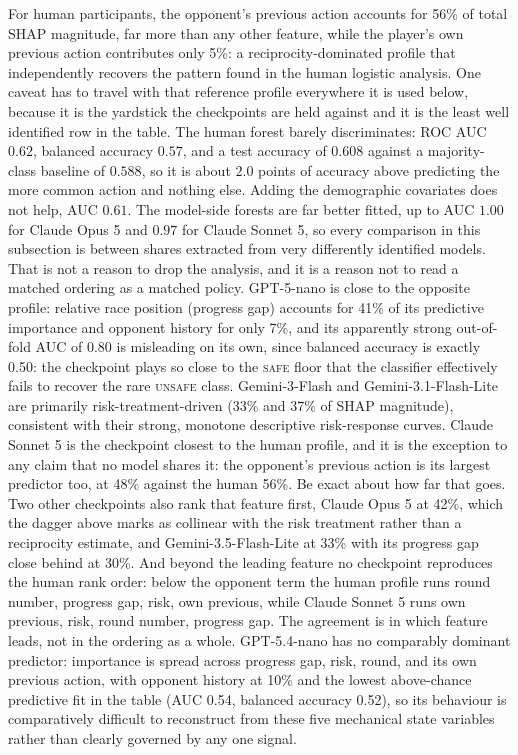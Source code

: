 \documentclass{article}
\newcommand{\Safe}{\textsc{safe}}
\newcommand{\Unsafe}{\textsc{unsafe}}
\begin{document}
For human participants, the opponent's previous action accounts for 56\%
of total SHAP magnitude, far more than any other feature, while the
player's own previous action contributes only 5\%: a reciprocity-dominated
profile that independently recovers the pattern found in the human
logistic analysis. One caveat has to travel with that reference profile
everywhere it is used below, because it is the yardstick the checkpoints are
held against and it is the least well identified row in the table. The human
forest barely discriminates: ROC AUC $0.62$, balanced accuracy $0.57$, and a
test accuracy of $0.608$ against a majority-class baseline of $0.588$, so it
is about $2.0$ points of accuracy above predicting the more common action and
nothing else. Adding the demographic covariates does not help, AUC $0.61$.
The model-side forests are far better fitted, up to AUC $1.00$ for Claude
Opus 5 and $0.97$ for Claude Sonnet 5, so every comparison in this subsection
is between shares extracted from very differently identified models. That is
not a reason to drop the analysis, and it is a reason not to read a matched
ordering as a matched policy. GPT-5-nano is close to the opposite profile: relative
race position (progress gap) accounts for 41\% of its predictive
importance and opponent history for only 7\%, and its apparently strong
out-of-fold AUC of 0.80 is misleading on its own, since balanced accuracy is
exactly 0.50: the checkpoint plays so close to the \Safe{} floor that the
classifier effectively fails to recover the rare \Unsafe{} class.
Gemini-3-Flash and Gemini-3.1-Flash-Lite are primarily
risk-treatment-driven (33\%
and 37\% of SHAP magnitude), consistent with their strong, monotone
descriptive risk-response curves. Claude Sonnet 5 is the checkpoint closest to
the human profile, and it is the exception to any claim that no model shares
it: the opponent's previous action is its largest predictor too, at 48\%
against the human 56\%. Be exact about how far that goes. Two other
checkpoints also rank that feature first, Claude Opus 5 at 42\%, which the
dagger above marks as collinear with the risk treatment rather than a
reciprocity estimate, and Gemini-3.5-Flash-Lite at 33\% with its progress gap
close behind at 30\%. And beyond the leading feature no checkpoint reproduces
the human rank order: below the opponent term the human profile runs round
number, progress gap, risk, own previous, while Claude Sonnet 5 runs own
previous, risk, round number, progress gap. The agreement is in which feature
leads, not in the ordering as a whole. GPT-5.4-nano has no
comparably dominant predictor: importance is
spread across progress gap, risk, round, and its own previous action,
with opponent history at 10\% and the lowest above-chance predictive
fit in the table (AUC 0.54, balanced accuracy 0.52), so its behaviour is
comparatively difficult to reconstruct from these five mechanical state
variables rather than clearly governed by any one signal.
\end{document}
